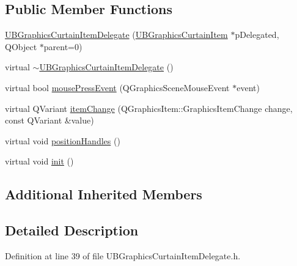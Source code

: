 \subsection*{Public Member Functions}
\begin{DoxyCompactItemize}
\item 
\hyperlink{class_u_b_graphics_curtain_item_delegate_a76361c3f15f4ddc53164e9c452774685}{U\-B\-Graphics\-Curtain\-Item\-Delegate} (\hyperlink{class_u_b_graphics_curtain_item}{U\-B\-Graphics\-Curtain\-Item} $\ast$p\-Delegated, Q\-Object $\ast$parent=0)
\item 
virtual \hyperlink{class_u_b_graphics_curtain_item_delegate_acf70af994366459d16c38af4d81caaf6}{$\sim$\-U\-B\-Graphics\-Curtain\-Item\-Delegate} ()
\item 
virtual bool \hyperlink{class_u_b_graphics_curtain_item_delegate_a249f9c655220d2171acea7a3a656c527}{mouse\-Press\-Event} (Q\-Graphics\-Scene\-Mouse\-Event $\ast$event)
\item 
virtual Q\-Variant \hyperlink{class_u_b_graphics_curtain_item_delegate_a9480eca07b4d202e63a718b5e8a6263f}{item\-Change} (Q\-Graphics\-Item\-::\-Graphics\-Item\-Change change, const Q\-Variant \&value)
\item 
virtual void \hyperlink{class_u_b_graphics_curtain_item_delegate_a9cad3186c84745ba1aa13f879a263a58}{position\-Handles} ()
\item 
virtual void \hyperlink{class_u_b_graphics_curtain_item_delegate_a104baa2babd8d7f8142d11257b750e88}{init} ()
\end{DoxyCompactItemize}
\subsection*{Additional Inherited Members}


\subsection{Detailed Description}


Definition at line 39 of file U\-B\-Graphics\-Curtain\-Item\-Delegate.\-h.



